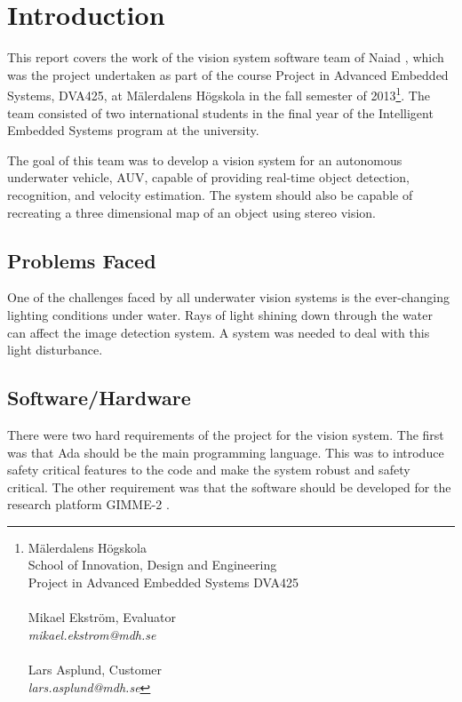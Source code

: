 \section{Introduction}\label{sec:introduction}
This report covers the work of the vision system software team of Naiad \cite{web:naiad}, which was the project undertaken as part of the course Project in Advanced Embedded Systems, DVA425, at M\"{a}lerdalens H\"{o}gskola in the fall semester of 2013\footnote{M\"{a}lerdalens H\"{o}gskola \\School of Innovation, Design and Engineering\\Project in Advanced Embedded Systems DVA425\\ \\Mikael Ekstr\"{o}m, Evaluator \\ \textit{mikael.ekstrom@mdh.se}\\ \\Lars Asplund, Customer\\ \textit{lars.asplund@mdh.se}}. The team consisted of two international students in the final year of the Intelligent Embedded Systems program at the university.

The goal of this team was to develop a vision system for an autonomous underwater vehicle, AUV, capable of providing real-time object detection, recognition, and velocity estimation. The system should also be capable of recreating a three dimensional map of an object using stereo vision.

\subsection{Problems Faced}
One of the challenges faced by all underwater vision systems is the ever-changing lighting conditions under water. Rays of light shining down through the water can affect the image detection system. A system was needed to deal with this light disturbance.

\subsection{Software/Hardware}
There were two hard requirements of the project for the vision system. The first was that Ada \cite{web:mcsada} should be the main programming language. This was to introduce safety critical features to the code and make the system robust and safety critical. The other requirement was that the software should be developed for the research platform GIMME-2 \cite{web:GIMME2}. 


